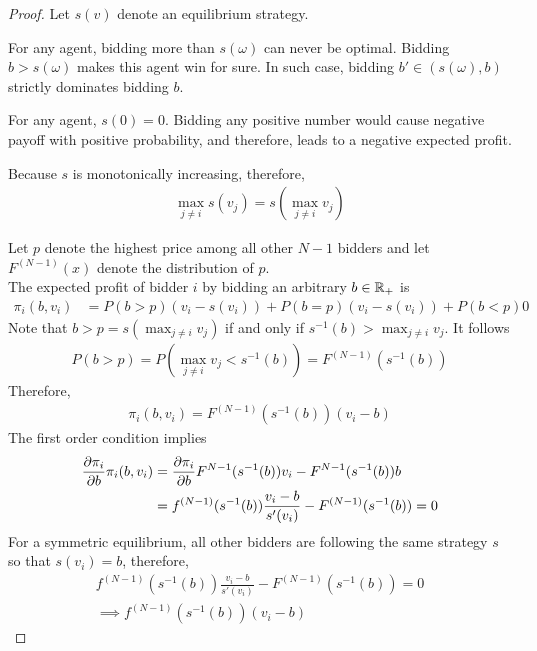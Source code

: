 \documentclass{book}
\begin{document}
	\begin{proof}
		Let $s(v)$ denote an equilibrium strategy.
		\begin{lemma}
			For any agent, bidding more than $s(\omega)$ can never be optimal. Bidding $b > s(\omega)$ makes this agent win for sure. In such case, bidding $b' \in (s(\omega), b)$ strictly dominates bidding $b$.
		\end{lemma}
		\begin{lemma}
			For any agent, $s(0) = 0$. Bidding any positive number would cause negative payoff with positive probability, and therefore, leads to a negative expected profit.
		\end{lemma}
		\begin{lemma}
			Because $s$ is monotonically increasing, therefore,
			\begin{align}
				\max_{j \neq i} s(v_j) = s(\max_{j \neq i} v_j)
			\end{align}
		\end{lemma}
		Let $p$ denote the highest price among all other $N-1$ bidders and let $F^{(N-1)}(x)$ denote the distribution of $p$. \\
		The expected profit of bidder $i$ by bidding an arbitrary $b \in \mathbb{R}_+$ is
		\begin{align}
			\pi_i(b, v_i) &= P(b > p) (v_i - s(v_i))
			+ P(b = p) (v_i - s(v_i))
			+ P(b < p) 0
		\end{align}
		Note that $b > p = s(\max_{j \neq i}v_j)$ if and only if $s^{-1}(b) > \max_{j \neq i}v_j$. It follows
		\begin{align}
			P(b > p) = P(\max_{j \neq i}v_j < s^{-1}(b)) = F^{(N-1)}(s^{-1}(b))
		\end{align}
		Therefore,
		\begin{align}
			\pi_i(b, v_i) = F^{(N-1)}(s^{-1}(b)) (v_i - b)
		\end{align}
		The first order condition implies
		\begin{align}
			\frac{\partial{\pi_i}}{\partial{b}} \pi_i (b, v_i) 
			&= \frac{\partial{\pi_i}}{\partial{b}} F^{N-1} (s^{-1}(b)) v_i - F^{N-1} (s^{-1}(b)) b \\
			&= f^{(N-1)}(s^{-1}(b)) \frac{v_i - b}{s'(v_i)}
			- F^{(N-1)}(s^{-1}(b)) = 0
		\end{align}
		For a symmetric equilibrium, all other bidders are following the same strategy $s$ so that $s(v_i) = b$, therefore, 
		\begin{align}
			f^{(N-1)}(s^{-1}(b)) \frac{v_i - b}{s'(v_i)}
			- F^{(N-1)}(s^{-1}(b)) = 0 \\
			\implies f^{(N-1)}(s^{-1}(b)) (v_i - b)

\end{align}
\end{proof}
\end{document}
